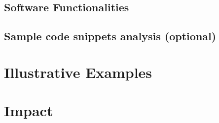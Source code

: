 \documentclass[preprint,12pt, a4paper]{elsarticle}
\begin{document}
\subsection{Software Functionalities}


\subsection{Sample code snippets analysis (optional)}


\section{Illustrative Examples}



\section{Impact}





\end{document}
